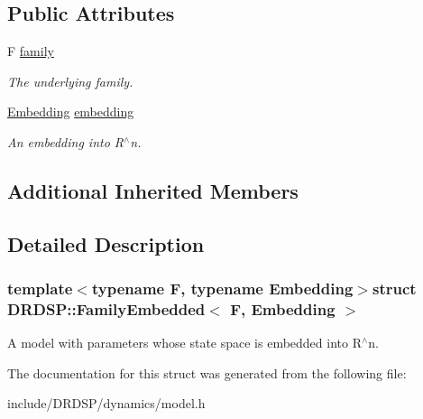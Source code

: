 \subsection*{Public Attributes}
\begin{DoxyCompactItemize}
\item 
\hypertarget{struct_d_r_d_s_p_1_1_family_embedded_af864495b07bc6181f422c290e322d055}{F \hyperlink{struct_d_r_d_s_p_1_1_family_embedded_af864495b07bc6181f422c290e322d055}{family}}\label{struct_d_r_d_s_p_1_1_family_embedded_af864495b07bc6181f422c290e322d055}

\begin{DoxyCompactList}\small\item\em The underlying family. \end{DoxyCompactList}\item 
\hypertarget{struct_d_r_d_s_p_1_1_family_embedded_a475108793c9f20f746263aed814c3651}{\hyperlink{struct_d_r_d_s_p_1_1_embedding}{Embedding} \hyperlink{struct_d_r_d_s_p_1_1_family_embedded_a475108793c9f20f746263aed814c3651}{embedding}}\label{struct_d_r_d_s_p_1_1_family_embedded_a475108793c9f20f746263aed814c3651}

\begin{DoxyCompactList}\small\item\em An embedding into R$^\wedge$n. \end{DoxyCompactList}\end{DoxyCompactItemize}
\subsection*{Additional Inherited Members}


\subsection{Detailed Description}
\subsubsection*{template$<$typename F, typename Embedding$>$struct D\-R\-D\-S\-P\-::\-Family\-Embedded$<$ F, Embedding $>$}

A model with parameters whose state space is embedded into R$^\wedge$n. 

The documentation for this struct was generated from the following file\-:\begin{DoxyCompactItemize}
\item 
include/\-D\-R\-D\-S\-P/dynamics/model.\-h\end{DoxyCompactItemize}

